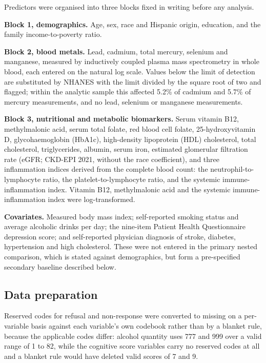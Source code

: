 \documentclass[12pt]{article}
\begin{document}
Predictors were organised into three blocks fixed in writing before any analysis.

\textbf{Block 1, demographics.} Age, sex, race and Hispanic origin, education, and the family income-to-poverty ratio.

\textbf{Block 2, blood metals.} Lead, cadmium, total mercury, selenium and manganese, measured by inductively coupled plasma mass spectrometry in whole blood, each entered on the natural log scale. Values below the limit of detection are substituted by NHANES with the limit divided by the square root of two and flagged; within the analytic sample this affected 5.2\% of cadmium and 5.7\% of mercury measurements, and no lead, selenium or manganese measurements.

\textbf{Block 3, nutritional and metabolic biomarkers.} Serum vitamin B12, methylmalonic acid, serum total folate, red blood cell folate, 25-hydroxyvitamin D, glycohaemoglobin (HbA1c), high-density lipoprotein (HDL) cholesterol, total cholesterol, triglycerides, albumin, serum iron, estimated glomerular filtration rate (eGFR; CKD-EPI 2021, without the race coefficient), and three inflammation indices derived from the complete blood count: the neutrophil-to-lymphocyte ratio, the platelet-to-lymphocyte ratio, and the systemic immune-inflammation index. Vitamin B12, methylmalonic acid and the systemic immune-inflammation index were log-transformed.

\textbf{Covariates.} Measured body mass index; self-reported smoking status and average alcoholic drinks per day; the nine-item Patient Health Questionnaire depression score; and self-reported physician diagnosis of stroke, diabetes, hypertension and high cholesterol. These were not entered in the primary nested comparison, which is stated against demographics, but form a pre-specified secondary baseline described below.

\subsection*{Data preparation}

Reserved codes for refusal and non-response were converted to missing on a per-variable basis against each variable's own codebook rather than by a blanket rule, because the applicable codes differ: alcohol quantity uses 777 and 999 over a valid range of 1 to 82, while the cognitive score variables carry no reserved codes at all and a blanket rule would have deleted valid scores of 7 and 9.
\end{document}
